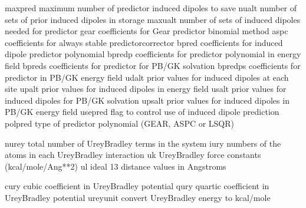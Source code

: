 \documentclass[letterpaper,11pt,english]{sphinxmanual}
\begin{document}
\sphinxAtStartPar
{}

\begin{sphinxVerbatim}[commandchars=\\\{\}]
maxpred         maximum number of predictor induced dipoles to save
nualt           number of sets of prior induced dipoles in storage
maxualt         number of sets of induced dipoles needed for predictor
gear            coefficients for Gear predictor binomial method
aspc            coefficients for always stable predictor\PYGZhy{}corrector
bpred           coefficients for induced dipole predictor polynomial
bpredp          coefficients for predictor polynomial in energy field
bpreds          coefficients for predictor for PB/GK solvation
bpredps         coefficients for predictor in PB/GK energy field
udalt           prior values for induced dipoles at each site
upalt           prior values for induced dipoles in energy field
usalt           prior values for induced dipoles for PB/GK solvation
upsalt          prior values for induced dipoles in PB/GK energy field
use\PYGZus{}pred        flag to control use of induced dipole prediction
polpred         type of predictor polynomial (GEAR, ASPC or LSQR)
\end{sphinxVerbatim}

\sphinxAtStartPar
{}

\begin{sphinxVerbatim}[commandchars=\\\{\}]
nurey           total number of Urey\PYGZhy{}Bradley terms in the system
iury            numbers of the atoms in each Urey\PYGZhy{}Bradley interaction
uk              Urey\PYGZhy{}Bradley force constants (kcal/mole/Ang**2)
ul              ideal 1\PYGZhy{}3 distance values in Angstroms
\end{sphinxVerbatim}

\sphinxAtStartPar
{}

\begin{sphinxVerbatim}[commandchars=\\\{\}]
cury            cubic coefficient in Urey\PYGZhy{}Bradley potential
qury            quartic coefficient in Urey\PYGZhy{}Bradley potential
ureyunit        convert Urey\PYGZhy{}Bradley energy to kcal/mole
\end{sphinxVerbatim}
\end{document}
